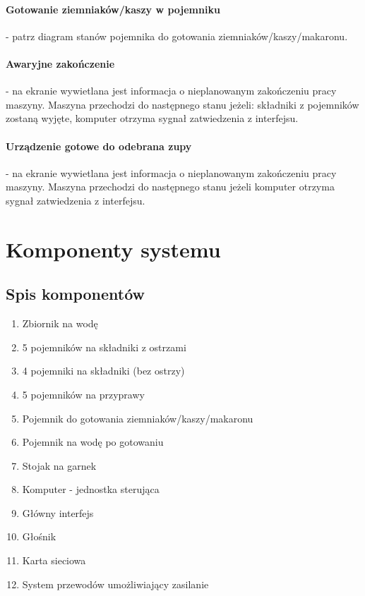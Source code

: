 \documentclass[12pt,a4paper,notitlepage]{article}
\begin{document}
\paragraph{Gotowanie ziemniaków/kaszy w pojemniku} - patrz diagram stanów pojemnika do gotowania ziemniaków/kaszy/makaronu.
\paragraph{Awaryjne zakończenie} - na ekranie wywietlana jest informacja o nieplanowanym zakończeniu pracy maszyny. Maszyna przechodzi do następnego stanu jeżeli: składniki z pojemników zostaną wyjęte, komputer otrzyma sygnał zatwiedzenia z interfejsu.
\paragraph{Urządzenie gotowe do odebrana zupy} - na ekranie wywietlana jest informacja o nieplanowanym zakończeniu pracy maszyny. Maszyna przechodzi do następnego stanu jeżeli komputer otrzyma sygnał zatwiedzenia z interfejsu.


\newpage
\section{Komponenty systemu}

\subsection{Spis komponentów}
\begin{enumerate}
  \item Zbiornik na wodę
  \item 5 pojemników na składniki z ostrzami
  \item 4 pojemniki na składniki (bez ostrzy)
  \item 5 pojemników na przyprawy
  \item Pojemnik do gotowania ziemniaków/kaszy/makaronu
  \item Pojemnik na wodę po gotowaniu
  \item Stojak na garnek
  \item Komputer - jednostka sterująca
  \item Główny interfejs
  \item Głośnik
  \item Karta sieciowa
  \item System przewodów umożliwiający zasilanie
\end{enumerate}
\end{document}
